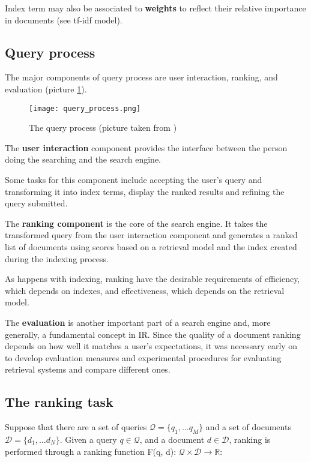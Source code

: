 Index term may also be associated to \textbf{weights} to reflect their relative importance in documents (see tf-idf model).

\subsection{Query process}

The major components of query process are user interaction, ranking, and evaluation (picture \ref{fig:query process}).

\begin{figure}
  \centering
  \texttt{[image: query\_process.png]}
  \caption{The query process (picture taken from \cite{croftIR})}
  \label{fig:query process}
\end{figure}

The \textbf{user interaction} component provides the interface between the person doing the searching and the search engine.

Some tasks for this component include accepting the user's query and transforming it into index terms, display the ranked results and refining the query submitted.

The \textbf{ranking component} is the core of the search engine. It takes the transformed query from the user interaction component and generates a ranked list of documents using scores based on a retrieval model and the index created during the indexing process.

As happens with indexing, ranking have the desirable requirements of efficiency, which depends on indexes, and effectiveness, which depends on the retrieval model.

The \textbf{evaluation} is another important part of a search engine and, more generally, a fundamental concept in IR. Since the quality of a document ranking depends on how well it matches a user's expectations, it was necessary early on to develop evaluation measures and experimental procedures for evaluating retrieval systems and compare different ones.

\subsection{The ranking task}
\label{sssec:rnktsk}

Suppose that there are a set of queries $\mathcal{Q}=\{q_1, \dots q_M\}$ and a
set of documents $\mathcal{D} = \{d_1, \dots d_N\}$. Given a query $q \in  \mathcal{Q}$, and a document $d \in \mathcal{D}$, ranking is performed through a ranking function F(q, d):
$\mathcal{Q} \times \mathcal{D} \rightarrow \mathbb{R}$:

